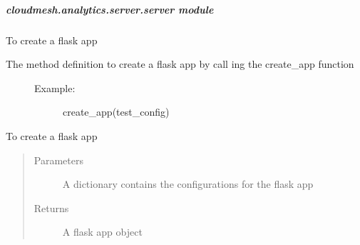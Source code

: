 \documentclass[letterpaper,10pt,english]{sphinxmanual}
\begin{document}
\begin{fulllineitems}
\label{\detokenize{cloudmesh.analytics.server:cloudmesh.analytics.server.db.init_db}}
\end{fulllineitems}



\subparagraph{cloudmesh.analytics.server.server module}
\label{\detokenize{cloudmesh.analytics.server:module-cloudmesh.analytics.server.server}}\label{\detokenize{cloudmesh.analytics.server:cloudmesh-analytics-server-server-module}}
To create a flask app
\begin{description}
\item[{The method definition to create a flask app by call ing the create\_app function}] \leavevmode\begin{description}
\item[{Example:}] \leavevmode
create\_app(test\_config)

\end{description}

\end{description}

\begin{fulllineitems}
\label{\detokenize{cloudmesh.analytics.server:cloudmesh.analytics.server.server.create_app}}
To create a flask app
\begin{quote}\begin{description}
\item[{Parameters}] \leavevmode
{} \textendash{} A dictionary contains the configurations for the flask app

\item[{Returns}] \leavevmode
A flask app object

\end{description}\end{quote}

\end{fulllineitems}
\end{document}
